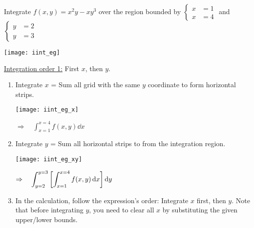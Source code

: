 \documentclass[class=article, crop=false, 12pt]{standalone}
\begin{document}
\begin{example}
    Integrate $f(x,y) = x^2y-xy^3$ over the region bounded by 
    $\begin{cases}x&=1\\x&=4\end{cases}$ and $\begin{cases}y&=2\\y&=3\end{cases}$

    \begin{center}
        \texttt{[image: iint\_eg]}
    \end{center}

    \ul{Integration order 1:} First $x$, then $y$.
    \begin{enumerate}
        \item Integrate $x$ = Sum all grid with the same $y$ coordinate to form horizontal strips.
        
        \begin{center}
            \begin{minipage}{0.55\textwidth}
                \centering
                \texttt{[image: iint\_eg\_x]}
            \end{minipage}
            $\displaystyle \Rightarrow \quad  \int_{x=1}^{x=4}f(x,y)\dd{x}$
        \end{center}

        
        \item Integrate $y$ = Sum all horizontal strips to from the integration region.
        
        \begin{center}
            \begin{minipage}{0.55\textwidth}
                \centering
                \texttt{[image: iint\_eg\_xy]}
            \end{minipage}
            $\displaystyle \Rightarrow \quad  \int_{y=2}^{y=3}\qty[\int_{x=1}^{x=4}f(x,y)\dd{x}]\dd{y}$
        \end{center}

        \item In the calculation, follow the expression's order: Integrate $x$ first, then $y$. 
        Note that before integrating $y$, you need to clear all $x$ by substituting the given upper/lower bounds.
    \end{enumerate}


\end{example}
\end{document}
